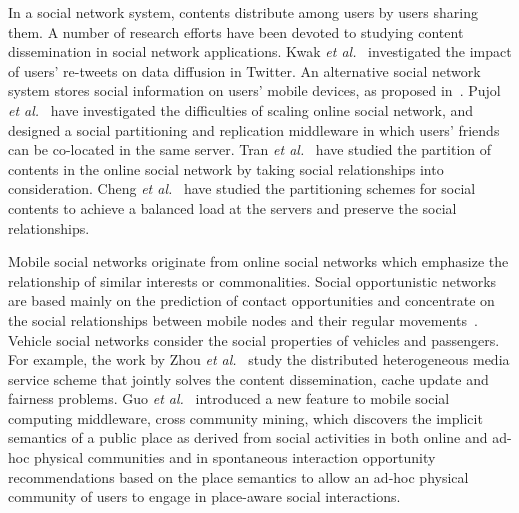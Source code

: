 In a social network system, contents distribute among users by users sharing them. A number of research efforts have been devoted to studying content dissemination in social network applications. Kwak {\it et al.}~\cite{HKwak2010} investigated the impact of users' re-tweets on data diffusion in Twitter. An alternative social network system stores social information on users' mobile devices, as proposed in~\cite{AKPietilainen2009}. Pujol {\it et al.}~\cite{Pujol2010} have investigated the difficulties of scaling online social network, and designed a social partitioning and replication middleware in which users' friends can be co-located in the same server. Tran {\it et al.}~\cite{DTran2012} have studied the partition of contents in the online social network by taking social relationships into consideration. Cheng {\it et al.}~\cite{XCheng2011} have studied the partitioning schemes for social contents to achieve a balanced load at the servers and preserve the social relationships.

Mobile social networks originate from online social networks which emphasize the relationship of similar interests or commonalities. Social opportunistic networks are based mainly on the prediction of contact opportunities and concentrate on the social relationships between mobile nodes and their regular movements~\cite{FXia2013}. Vehicle social networks consider the social properties of vehicles and passengers. For example, the work by Zhou {\it et al.}~\cite{LZhou2011} study the distributed heterogeneous media service scheme that jointly solves the content dissemination, cache update and fairness problems. Guo {\it et al.}~\cite{BGuo2013} introduced a new feature to mobile social computing middleware, cross community mining, which discovers the implicit semantics of a public place as derived from social activities in both online and ad-hoc physical communities and in spontaneous interaction opportunity recommendations based on the place semantics to allow an ad-hoc physical community of users to engage in place-aware social interactions.

